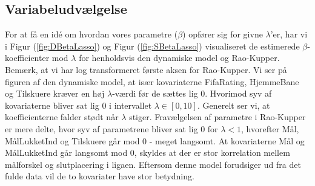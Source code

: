 \documentclass[11pt,a4paper]{article}
\begin{document}
\subsection{Variabeludvælgelse}
For at få en idé om hvordan vores parametre ($\beta$) opfører sig for givne $\lambda$'er, har vi i Figur (\ref{fig:DBetaLasso}) og Figur (\ref{fig:SBetaLasso}) visualiseret de estimerede $\beta$-koefficienter mod $\lambda$ for henholdsvis den dynamiske model og Rao-Kupper. Bemærk, at vi har log transformeret første aksen for Rao-Kupper. Vi ser på figuren af den dynamiske model, at især kovariaterne FifaRating, HjemmeBane og Tilskuere kræver en høj $\lambda$-værdi før de sættes lig 0. Hvorimod syv af kovariaterne bliver sat lig 0 i intervallet $\lambda \in [0,10]$. Generelt ser vi, at koefficienterne falder stødt når $\lambda$ stiger. Fravælgelsen af parametre i Rao-Kupper er mere delte, hvor syv af parametrene bliver sat lig 0 for $\lambda<1$, hvorefter Mål, MålLukketInd og Tilskuere går mod 0 - meget langsomt. At kovariaterne Mål og MålLukketInd går langsomt mod 0, skyldes at der er stor korrelation mellem målforskel og slutplacering i ligaen. Eftersom denne model forudsiger ud fra det fulde data vil de to kovariater have stor betydning. 
\\
\end{document}
